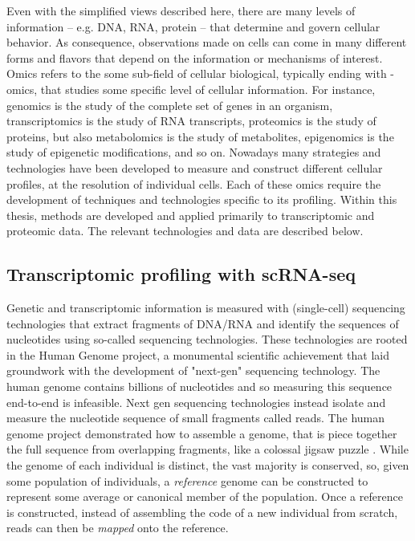 Even with the simplified views described here, there are many levels of information -- e.g. DNA, RNA, protein -- that determine and govern cellular behavior.
As consequence, observations made on cells can come in many different forms and flavors that depend on the information or mechanisms of interest.
Omics refers to the some sub-field of cellular biological, typically ending with -omics, that studies some specific level of cellular information.
For instance,
genomics is the study of the complete set of genes in an organism,
transcriptomics is the study of RNA transcripts,
proteomics is the study of proteins,
but also
metabolomics is the study of metabolites,
epigenomics is the study of epigenetic modifications,
and so on.
Nowadays many strategies and technologies have been developed to measure and construct different cellular profiles, at the resolution of individual cells.
Each of these omics require the development of techniques and technologies specific to its profiling.
Within this thesis, methods are developed and applied primarily to transcriptomic and proteomic data.
The relevant technologies and data are described below.


\subsection{Transcriptomic profiling with scRNA-seq}
Genetic and transcriptomic information is measured with (single-cell) sequencing technologies that extract fragments of DNA/RNA and identify the sequences of nucleotides 
using so-called sequencing technologies.
These technologies are rooted in the Human Genome project,
a monumental scientific achievement that laid groundwork with the development of "next-gen" sequencing technology.
The human genome contains billions of nucleotides and so measuring this sequence end-to-end is infeasible.
Next gen sequencing technologies instead isolate and measure the nucleotide sequence of small fragments called reads.
The human genome project demonstrated how to assemble a genome, that is piece together the full sequence from overlapping fragments, like a colossal jigsaw puzzle \cite{lander2001}.
While the genome of each individual is distinct, the vast majority is conserved,
so, given some population of individuals, a \emph{reference} genome can be constructed to represent some average or canonical member of the population.
Once a reference is constructed, instead of assembling the code of a new individual from scratch, reads can then be \emph{mapped} onto the reference.

